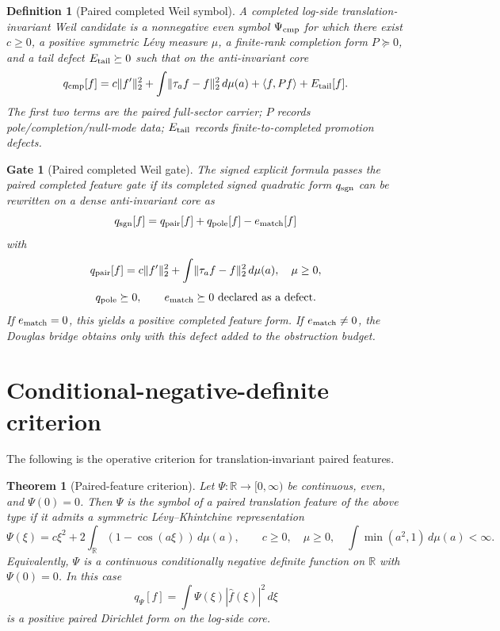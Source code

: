 \documentclass[11pt]{article}
\newtheorem{theorem}{Theorem}
\newtheorem{definition}{Definition}
\newtheorem{gate}{Gate}
\newcommand{\R}{\mathbb R}
\newcommand{\ip}[2]{\langle #1,#2\rangle}
\newcommand{\norm}[1]{\lVert #1\rVert}
\begin{document}
\begin{definition}[Paired completed Weil symbol]
A completed log-side translation-invariant Weil candidate is a nonnegative even symbol \(\Psi_{\rm cmp}\) for which there exist \(c\ge0\), a positive symmetric L\'evy measure \(\mu\), a finite-rank completion form \(P\succeq0\), and a tail defect \(E_{\rm tail}\succeq0\) such that on the anti-invariant core
\[
q_{\rm cmp}[f]
=
 c\norm{f'}_2^2+
\int\norm{\tau_a f-f}_2^2\,d\mu(a)
+
\ip{f}{P f}
+
E_{\rm tail}[f].
\]
The first two terms are the paired full-sector carrier; \(P\) records pole/completion/null-mode data; \(E_{\rm tail}\) records finite-to-completed promotion defects.
\end{definition}

\begin{gate}[Paired completed Weil gate]
The signed explicit formula passes the paired completed feature gate if its completed signed quadratic form \(q_{\rm sgn}\) can be rewritten on a dense anti-invariant core as
\[
q_{\rm sgn}[f]
=
q_{\rm pair}[f]+q_{\rm pole}[f]-e_{\rm match}[f]
\]
with
\[
q_{\rm pair}[f]=c\norm{f'}_2^2+\int \norm{\tau_a f-f}_2^2\,d\mu(a),
\quad \mu\ge0,
\]
\[
q_{\rm pole}\succeq0,
\qquad
 e_{\rm match}\succeq0 \text{ declared as a defect.}
\]
If \(e_{\rm match}=0\), this yields a positive completed feature form.  If \(e_{\rm match}\neq0\), the Douglas bridge obtains only with this defect added to the obstruction budget.
\end{gate}

\section{Conditional-negative-definite criterion}

The following is the operative criterion for translation-invariant paired features.

\begin{theorem}[Paired-feature criterion]
Let \(\Psi:\R\to[0,\infty)\) be continuous, even, and \(\Psi(0)=0\).  Then \(\Psi\) is the symbol of a paired translation feature of the above type if it admits a symmetric L\'evy--Khintchine representation
\[
\Psi(\xi)
=
 c\xi^2+2\int_\R (1-\cos(a\xi))\,d\mu(a),
\qquad
c\ge0,
\quad \mu\ge0,
\quad \int \min(a^2,1)\,d\mu(a)<\infty.
\]
Equivalently, \(\Psi\) is a continuous conditionally negative definite function on \(\R\) with \(\Psi(0)=0\).  In this case
\[
q_\Psi[f]=\int\Psi(\xi)|\widehat f(\xi)|^2\,d\xi
\]
is a positive paired Dirichlet form on the log-side core.
\end{theorem}
\end{document}
